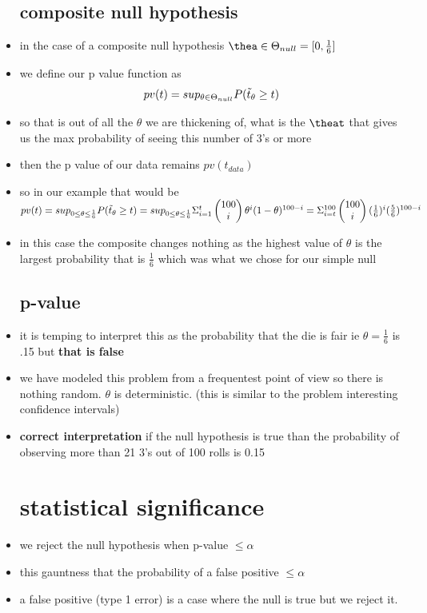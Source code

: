 \documentclass{article}
\begin{document}
\begin{itemize}
\subsection{composite null hypothesis}
\item in the case of a composite null hypothesis $\thea\in \Theta_{null}=[0,\frac{1}{6}]$
\item we define our p value function as $$pv(t)=sup_{\theta\in \Theta_{null}}P(\Tilde{t}_{\theta}\geq t)$$
\item so that is out of all the $\theta$ we are thickening of, what is the $\theat$ that gives us the max probability of seeing this number of 3's or more
\item then the p value of our data remains $pv(t_{data})$
\item so in our example that would be $pv(t)=sup_{0\leq \theta\leq \frac{1}{6}}P(\Tilde{t}_{\theta}\geq t)=\\sup_{0\leq \theta\leq \frac{1}{6}}\Sigma_{i=1}^{t}\begin{pmatrix}
100\\i    
\end{pmatrix}\theta^{i}(1-\theta)^{100-i}=\Sigma_{i=t}^{100}\begin{pmatrix}100\\i\end{pmatrix}(\frac{1}{6})^{i}(\frac{5}{6})^{100-i}$
\item in this case the composite changes nothing as the highest value of $\theta$ is the largest probability that is $\frac{1}{6}$ which was what we chose for our simple null
\subsection{p-value}
\item it is temping to interpret this as the probability that the die is fair ie $\theta=\frac{1}{6}$ is .15 but \textbf{that is false}
\item we have modeled this problem from a frequentest point of view so there is nothing random. $\theta$ is deterministic. (this is similar to the problem interesting confidence intervals)
\item \textbf{correct interpretation} if 
the null hypothesis is true than the probability of observing more than 21 3's out of 100 rolls is 0.15
\section{statistical significance}
\item  we reject the null hypothesis when p-value $\leq \alpha$
\item this gauntness that the probability of a false positive $\leq \alpha$
\item a false positive (type 1 error) is a case where the null is true but we reject it. 

\end{itemize}
\end{document}
